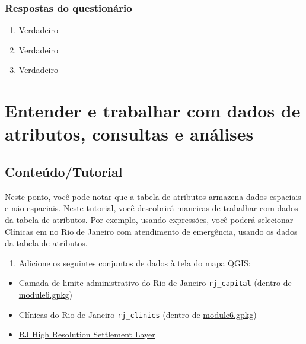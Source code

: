\documentclass[
  portuguese,
]{krantz}
\providecommand{\tightlist}{%
  \setlength{\itemsep}{0pt}\setlength{\parskip}{0pt}}
\begin{document}
\hypertarget{respostas-do-questionuxe1rio-3}{%
\subsubsection{\texorpdfstring{\textbf{Respostas do questionário}}{Respostas do questionário}}\label{respostas-do-questionuxe1rio-3}}

\begin{enumerate}
\def\labelenumi{\arabic{enumi}.}
\tightlist
\item
  Verdadeiro
\item
  Verdadeiro
\item
  Verdadeiro
\end{enumerate}

\hypertarget{entender-e-trabalhar-com-dados-de-atributos-consultas-e-anuxe1lises}{%
\section{Entender e trabalhar com dados de atributos, consultas e análises}\label{entender-e-trabalhar-com-dados-de-atributos-consultas-e-anuxe1lises}}

\hypertarget{conteuxfadotutorial-3}{%
\subsection{\texorpdfstring{\textbf{Conteúdo/Tutorial}}{Conteúdo/Tutorial}}\label{conteuxfadotutorial-3}}

Neste ponto, você pode notar que a tabela de atributos armazena dados espaciais e não espaciais. Neste tutorial, você descobrirá maneiras de trabalhar com dados da tabela de atributos. Por exemplo, usando expressões, você poderá selecionar Clínicas em no Rio de Janeiro com atendimento de emergência, usando os dados da tabela de atributos.

\begin{enumerate}
\def\labelenumi{\arabic{enumi}.}
\tightlist
\item
  Adicione os seguintes conjuntos de dados à tela do mapa QGIS:
\end{enumerate}

\begin{itemize}
\tightlist
\item
  Camada de limite administrativo do Rio de Janeiro \texttt{rj\_capital} (dentro de \href{data/module6.gpkg}{module6.gpkg})
\item
  Clínicas do Rio de Janeiro \texttt{rj\_clinics} (dentro de \href{data/module6.gpkg}{module6.gpkg})
\item
  \href{data/hrsl_rj_capital_populacao.tif}{RJ High Resolution Settlement Layer}
\end{itemize}
\end{document}
